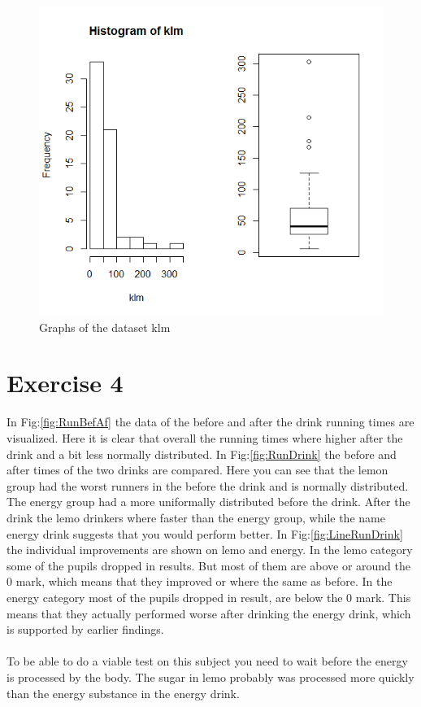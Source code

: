 \documentclass{article}
\begin{document}
    \begin{figure}
      \includegraphics[scale=0.3]{../results/resultKLM.png}
      \caption{Graphs of the dataset klm}
      \label{fig:GraphKLM}
    \end{figure}

  \section{Exercise 4}
    In Fig:\ref{fig:RunBefAf} the data of the before and after the drink running times are visualized.
    Here it is clear that overall the running times where higher after the drink and a bit less normally distributed.
    In Fig:\ref{fig:RunDrink} the before and after times of the two drinks are compared.
    Here you can see that the lemon group had the worst runners in the before the drink and is normally distributed.
    The energy group had a more uniformally distributed before the drink.
    After the drink the lemo drinkers where faster than the energy group, while the name energy drink suggests that you would perform better.
    In Fig:\ref{fig:LineRunDrink} the individual improvements are shown on lemo and energy.
    In the lemo category some of the pupils dropped in results.
    But most of them are above or around the 0 mark,
    which means that they improved or where the same as before.
    In the energy category most of the pupils dropped in result, are below the 0 mark.
    This means that they actually performed worse after drinking the energy drink, which is supported by earlier findings.\\\\
    To be able to do a viable test on this subject you need to wait before the energy is processed by the body.
    The sugar in lemo probably was processed more quickly than the energy substance in the energy drink.
\end{document}
